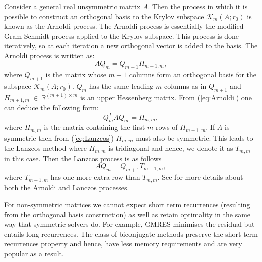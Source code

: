 \documentclass[msc,oneside]{ubcthesis}
\numberwithin{equation}{chapter}    %
\renewcommand{\eqref}[1]{(\ref{#1})}
\begin{document}
\begin{appendices}
Consider a general real unsymmetric matrix $A$. Then the process in which it is possible to construct an orthogonal basis to the Krylov subspace $\mathscr{K}_m(A;r_0)$ is known as the Arnoldi process. The Arnoldi process is essentially the modified Gram-Schmidt process applied to the Krylov subspace. This process is done iteratively, so at each iteration a new orthogonal vector is added to the basis. The Arnoldi process is written as:
\begin{equation} \label{eq:Arnoldi}
    AQ_m = Q_{m+1}H_{m+1,m},
\end{equation}
where $Q_{m+1}$ is the matrix whose $m+1$ columns form an orthogonal basis for the subspace $\mathscr{K}_m(A;r_0)$. $Q_m$ has the same leading $m$  columns as in $Q_{m+1}$ and $H_{m+1,m}~\in~\mathbb{R}^{(m+1)\times m}$ is an upper Hessenberg matrix. From \eqref{eq:Arnoldi} one can deduce the following form:
\begin{equation}
    \label{eq:Lanzcos}
    Q_{m}^TAQ_m = H_{{m,m}},
\end{equation}
where $H_{m,m}$ is the matrix containing the first $m$ rows of $H_{m+1,m}$. If $A$ is symmetric then from  \eqref{eq:Lanzcos}  $H_{m,m}$ must also be symmetric. This leads to the Lanzcos method where $H_{m,m}$ is tridiagonal and hence, we denote it as $T_{m,m}$ in this case. Then the Lanzcos process is as follows
\begin{equation} \label{eq:tridiag}
    AQ_m = Q_{m+1}T_{m+1,m},
\end{equation}
where $T_{m+1,m}$ has one more extra row than $T_{m,m}$. See \cite{saad2003iterative} for more details about both the Arnoldi and Lanczos processes.

\vspace{5mm}

For non-symmetric matrices we cannot expect short term recurrences (resulting from the orthogonal basis construction) as well as retain optimality in the same way that symmetric solvers do. For example, GMRES minimises the residual but entails long recurrences. The class of biconjugate methods preserve the short term recurrences property and hence, have less memory requirements and are very popular as a result.


\end{appendices}
\end{document}
